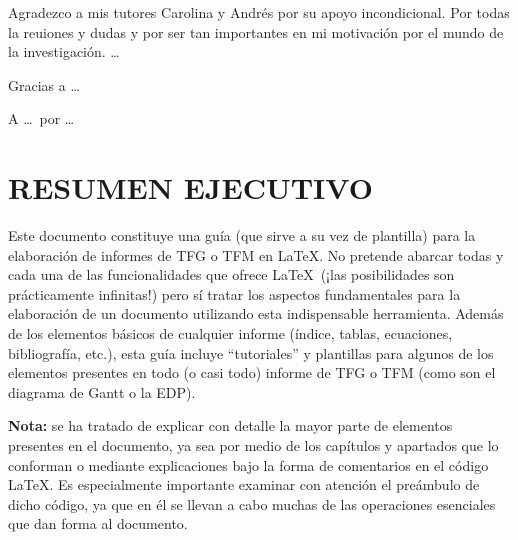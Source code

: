 \documentclass[a4paper, 11pt, spanish, twoside]{article}
\newcommand\blankpage{%
    \null
    \thispagestyle{empty}%
    \newpage}
\begin{document}
Agradezco a mis tutores Carolina y Andrés por su apoyo incondicional. Por todas la reuiones y dudas y por ser tan importantes en mi motivación por el mundo de la investigación.  \dots

Gracias a \dots

A \dots \ por \dots

\afterpage{\blankpage} %




\newpage
\section*{RESUMEN EJECUTIVO} %

Este documento constituye una guía (que sirve a su vez de plantilla) para la elaboración de informes de TFG o TFM en \LaTeX. No pretende abarcar todas y cada una de las funcionalidades que ofrece \LaTeX \ (¡las posibilidades son prácticamente infinitas!) pero sí tratar los aspectos fundamentales para la elaboración de un documento utilizando esta indispensable herramienta. Además de los elementos básicos de cualquier informe (índice, tablas, ecuaciones, bibliografía, etc.), esta guía incluye ``tutoriales'' y plantillas para algunos de los elementos presentes en todo (o casi todo) informe de TFG o TFM (como son el diagrama de Gantt o la EDP). 

\textbf{Nota:} se ha tratado de explicar con detalle la mayor parte de elementos presentes en el documento, ya sea por medio de los capítulos y apartados que lo conforman o mediante explicaciones bajo la forma de comentarios en el código \LaTeX. Es especialmente importante examinar con atención el preámbulo de dicho código, ya que en él se llevan a cabo muchas de las operaciones esenciales que dan forma al documento.
\end{document}
